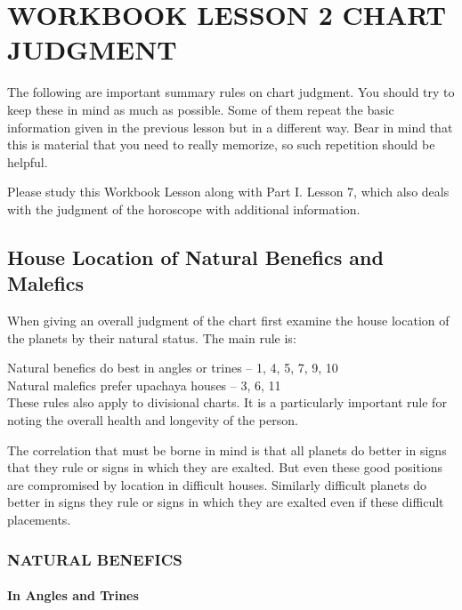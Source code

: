 
\section{WORKBOOK LESSON 2
CHART JUDGMENT}
 

The following are important summary rules on chart judgment. You should try to keep these in mind as much as possible. Some of them repeat the basic information given in the previous lesson but in a different way. Bear in mind that this is material that you need to really memorize, so such repetition should be helpful.

 

Please study this Workbook Lesson along with Part I. Lesson 7, which also deals with the judgment of the horoscope with additional information.

 



 

\subsection{House Location of Natural Benefics and Malefics}
 

When giving an overall judgment of the chart first examine the house location of the planets by their natural status. The main rule is:

 

Natural benefics do best in angles or trines – 1, 4, 5, 7, 9, 10 \\
Natural malefics prefer upachaya houses    – 3, 6, 11\\
 

These rules also apply to divisional charts. It is a particularly important rule for noting the overall health and longevity of the person.

The correlation that must be borne in mind is that all planets do better in signs that they rule or signs in which they are exalted. But even these good positions are compromised by location in difficult houses. Similarly difficult planets do better in signs they rule or signs in which they are exalted even if these difficult placements.

 

\subsubsection{NATURAL BENEFICS}
 

\paragraph{In Angles and Trines}


